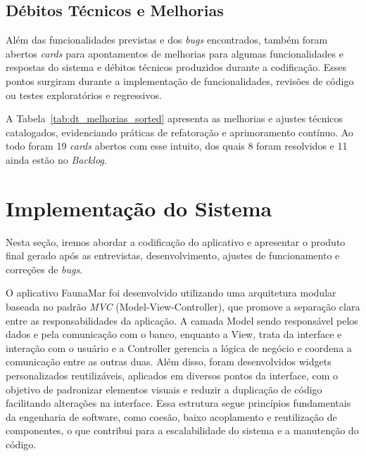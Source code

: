 

\subsection{Débitos Técnicos e Melhorias}
Além das funcionalidades previstas e dos \textit{bugs} encontrados, também foram abertos \textit{cards} 
para apontamentos de melhorias para algumas funcionalidades e respostas do sistema e débitos técnicos produzidos 
durante a codificação. 
Esses pontos surgiram durante a implementação de funcionalidades, revisões de código ou testes 
exploratórios e regressivos.

A Tabela~\ref{tab:dt_melhorias_sorted} apresenta as melhorias e ajustes técnicos catalogados, 
evidenciando práticas de refatoração e aprimoramento contínuo. Ao todo foram 19 \textit{cards} abertos com esse intuito,
dos quais 8 foram resolvidos e 11 ainda estão no \textit{Backlog}.




\section{Implementação do Sistema}
Nesta seção, iremos abordar a codificação do aplicativo e apresentar o produto final gerado após  
as entrevistas, desenvolvimento, ajustes de funcionamento e correções de \textit{bugs}.

O aplicativo FaunaMar foi desenvolvido utilizando uma arquitetura modular baseada no padrão \textit{MVC} 
(Model-View-Controller), que promove a separação clara entre as responsabilidades da aplicação. 
A camada Model sendo responsável pelos dados e pela comunicação com o banco, enquanto a View, trata 
da interface e interação com o usuário e a Controller gerencia a lógica de negócio e coordena a 
comunicação entre as outras duas. Além disso, foram desenvolvidos widgets personalizados reutilizáveis, 
aplicados em diversos pontos da interface, com o objetivo de padronizar elementos visuais e reduzir a 
duplicação de código facilitando alterações na interface. Essa estrutura segue princípios fundamentais 
da engenharia de software, como coesão, baixo acoplamento e reutilização de componentes, o 
que contribui para a escalabilidade do sistema e a manutenção do código.


